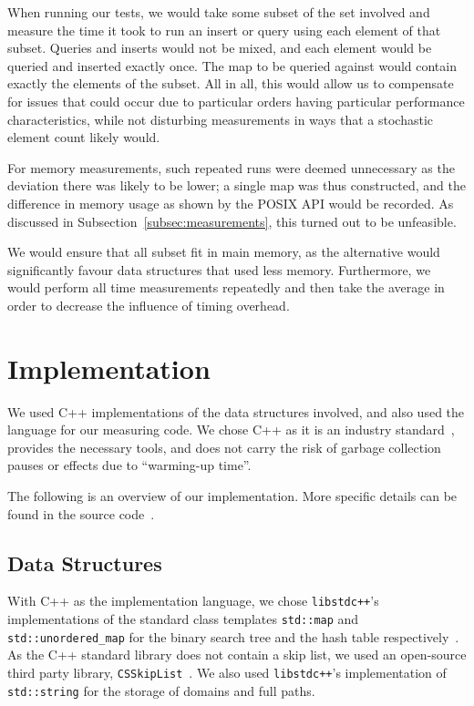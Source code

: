 \documentclass[12pt,a4paper]{article}
\begin{document}
    When running our tests, we would take some subset of the set involved and measure the time it
    took to run an insert or query using each element of that subset.  Queries and inserts would not
    be mixed, and each element would be queried and inserted exactly once.  The map to be queried
    against would contain exactly the elements of the subset.  All in all, this would allow us to
    compensate for issues that could occur due to particular orders having particular performance
    characteristics, while not disturbing measurements in ways that a stochastic element count
    likely would.

    For memory measurements, such repeated runs were deemed unnecessary as the deviation there was
    likely to be lower; a single map was thus constructed, and the difference in memory usage as
    shown by the POSIX API would be recorded.  As discussed in Subsection~\ref{subsec:measurements},
    this turned out to be unfeasible.

    We would ensure that all subset fit in main memory, as the alternative would significantly
    favour data structures that used less memory.  Furthermore, we would perform all time
    measurements repeatedly and then take the average in order to decrease the influence of timing
    overhead.


    \section{Implementation}
    \label{sec:implementation}

    We used C++ implementations of the data structures involved, and also used the language for our
    measuring code.  We chose C++ as it is an industry standard~\cite{TC++PL}, provides the
    necessary tools, and does not carry the risk of garbage collection pauses or effects due to
    ``warming-up time''.

    The following is an overview of our implementation.  More specific details can be found in the
    source code~\cite{OurCode}.

    \subsection{Data Structures}

    With C++ as the implementation language, we chose \texttt{libstdc++}'s implementations of the standard
    class templates \texttt{std::map} and \texttt{std::unordered\_map} for the binary search tree
    and the hash table respectively~\cite{C++11}.  As the C++ standard library does not contain a
    skip list, we used an open-source third party library, \texttt{CSSkipList}~\cite{CSSkipList}.
    We also used \texttt{libstdc++}'s implementation of \texttt{std::string} for the storage of
    domains and full paths.
\end{document}
